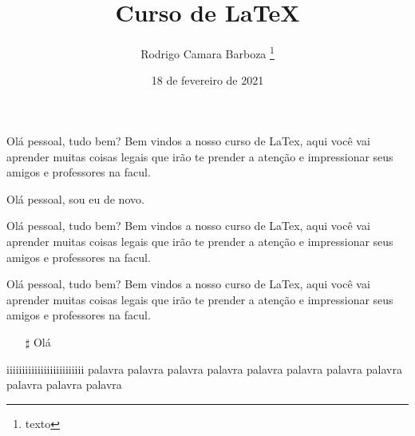 \documentclass[12pt, a4paper]{article}
\title{Curso de LaTeX}
\author {Rodrigo Camara Barboza \footnote{texto}}
\date{18 de fevereiro de 2021}
\begin{document}
\maketitle

Olá pessoal, tudo bem? Bem vindos a nosso curso de LaTex, aqui você vai aprender muitas coisas legais que irão te prender a atenção e impressionar seus amigos e professores na facul. 

\singlespacing
Olá pessoal, sou eu de novo.

\onehalfspacing
Olá pessoal, tudo bem? Bem vindos a nosso curso de LaTex, aqui você vai aprender muitas coisas legais que irão te prender a atenção e impressionar seus amigos e professores na facul. 

\doublespacing
Olá pessoal, tudo bem? Bem vindos a nosso curso de LaTex, aqui você vai aprender muitas coisas legais que irão te prender a atenção e impressionar seus amigos e professores na facul. \newline

\begin{itemize}
	
	\item[$\sharp$] Olá  %

\end{itemize}

iiiiiiiiiiiiiiiiiiiiiiiii palavra palavra palavra palavra palavra palavra palavra palavra palavra palavra palavra
\end{document}
